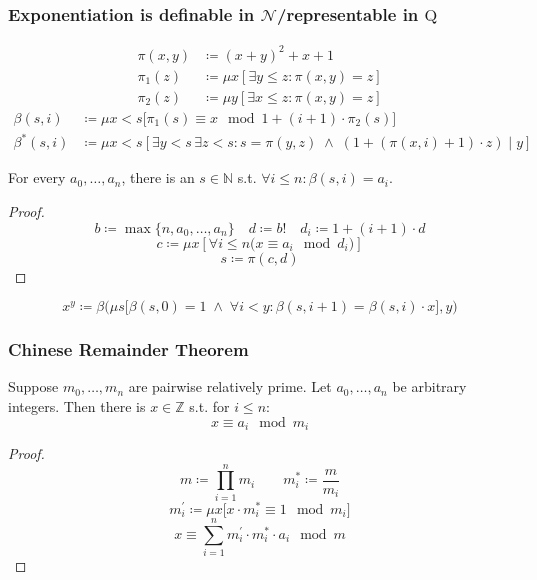 \documentclass[UTF8,aspectratio=43,11pt,colorlinks,compress,openany]{beamer}%
\begin{document}
\begin{frame}\frametitle{Exponentiation is definable in $\mathcal{N}$/representable in $\mathrm{Q}$}\vspace{-2ex}
\setlength\abovedisplayskip{0pt}
\setlength\belowdisplayskip{0pt}
	\begin{align*}
	\pi(x,y)&\coloneqq (x+y)^2+x+1\\
	\pi_1(z)&\coloneqq \mu x[\exists y\leq z:\pi(x,y)=z]\\
	\pi_2(z)&\coloneqq \mu y[\exists x\leq z:\pi(x,y)=z]
	\end{align*}
	\begin{align*}
	\beta(s,i)&\coloneqq \mu x<s\big[\pi_1(s)\equiv x\mod 1+(i+1)\cdot \pi_2(s)\big]\\
	\beta^*(s,i)&\coloneqq \mu x<s\left[\exists y<s\,\exists z<s: s=\pi(y,z)\;\wedge\;(1+(\pi(x,i)+1)\cdot z)\mid y\right]
	\end{align*}
	\begin{lemma}
		For every $a_0,\dots,a_n$, there is an $s\in\mathbb{N}$ s.t. $\forall i\leq n:\beta(s,i)=a_i$.
	\end{lemma}
	\begin{proof}\vspace{-1ex}
		\[b\coloneqq \max\{n,a_0,\dots,a_n\}\quad d\coloneqq b!\quad d_i\coloneqq 1+(i+1)\cdot d\]
		\[c\coloneqq \mu x\left[\forall i\leq n\big(x\equiv a_i\mod d_i\big)\right]\]
		\[s\coloneqq \pi(c,d)\]\vspace{-3ex}
	\end{proof}\vspace{-2ex}
	\[x^y\coloneqq \beta\Big(\mu s\big[\beta(s,0)=1\;\wedge\;\forall i<y:\beta(s,i+1)=\beta(s,i)\cdot x\big],y\Big)\]
\end{frame}

\begin{frame}\frametitle{Chinese Remainder Theorem}
	\begin{theorem}
		Suppose $m_0,\dots,m_n$ are pairwise relatively prime. Let
		$a_0,\dots,a_n$ be arbitrary integers. Then there is $x\in\mathbb{Z}$ s.t. for $i\leq n:$
		\[x\equiv a_i\mod m_i\]
	\end{theorem}
	\begin{proof}
		\[m\coloneqq \prod\limits_{i=1}^n m_i\qquad m_i^*\coloneqq \frac{m}{m_i}\]
		\[m_i^\prime\coloneqq \mu x\big[x\cdot m_i^*\equiv 1\mod m_i\big]\]
		\[x\equiv\sum\limits_{i=1}^n m_i^\prime\cdot m_i^*\cdot a_i\mod m\]\vspace{-1ex}
	\end{proof}
\end{frame}
\end{document}
